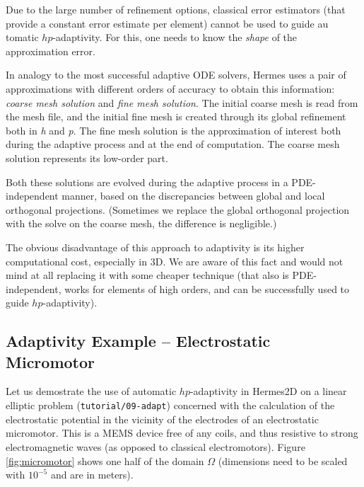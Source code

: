 \documentclass[11pt]{article}
\begin{document}
Due to the large number of refinement options, classical error estimators (that
provide a constant error estimate per element) cannot be used to guide au\-
tomatic $hp$-adaptivity. For this, one needs to know the {\it shape} of the
approximation error.

In analogy to the most successful adaptive ODE solvers,
Hermes uses a pair of approximations with different orders of accuracy to obtain
this information: {\em coarse mesh solution} and {\em
fine mesh solution}. The initial coarse mesh is read from the mesh file,
and the initial fine mesh is created through its global refinement both in
{\it h} and {\it p}.
The fine mesh solution is the approximation of interest both during the adaptive
process and at the end of computation. The coarse mesh
solution represents its low-order part.

Both these solutions are evolved during the adaptive process
in a PDE-inde\-pen\-dent manner, based on the discrepancies between global and local
orthogonal projections. (Sometimes we replace the global orthogonal projection with
the solve on the coarse mesh, the difference is negligible.)

The obvious disadvantage of this approach to adaptivity is its higher computational cost,
especially in 3D. We are aware of this fact and would not mind at all replacing it with
some cheaper technique (that also is PDE-independent, works for elements of high orders,
and can be successfully used to guide $hp$-adaptivity).

\subsection{Adaptivity Example -- Electrostatic Micromotor}

Let us demostrate the use of automatic $hp$-adaptivity in Hermes2D on a linear elliptic problem
({\tt tutorial/09-adapt}) concerned with the calculation of
the electrostatic potential in the vicinity of the electrodes of an electrostatic
micromotor. This is a MEMS device free of any coils, and thus resistive to
strong electromagnetic waves (as opposed to classical electromotors).
Figure \ref{fig:micromotor} shows one half of the domain $\Omega$
(dimensions need to be scaled with $10^{-5}$ and are in meters).
\end{document}
